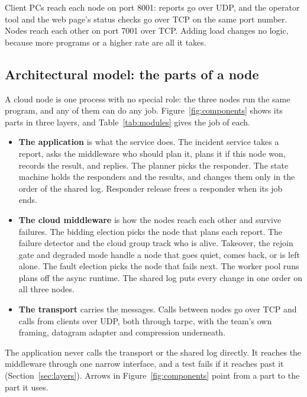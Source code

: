 Client PCs reach each node on port 8001: reports go over UDP, and the operator tool and the web page's status checks go over TCP on the same port number. Nodes reach each other on port 7001 over TCP. Adding load changes no logic, because more programs or a higher rate are all it takes.

\subsection{Architectural model: the parts of a node}
\label{sec:components}

A cloud node is one process with no special role: the three nodes run the same program, and any of them can do any job. Figure~\ref{fig:components} shows its parts in three layers, and Table~\ref{tab:modules} gives the job of each.

\begin{itemize}
  \item \textbf{The application} is what the service does. The incident service takes a report, asks the middleware who should plan it, plans it if this node won, records the result, and replies. The planner picks the responder. The state machine holds the responders and the results, and changes them only in the order of the shared log. Responder release frees a responder when its job ends.
  \item \textbf{The cloud middleware} is how the nodes reach each other and survive failures. The bidding election picks the node that plans each report. The failure detector and the cloud group track who is alive. Takeover, the rejoin gate and degraded mode handle a node that goes quiet, comes back, or is left alone. The fault election picks the node that fails next. The worker pool runs plans off the async runtime. The shared log puts every change in one order on all three nodes.
  \item \textbf{The transport} carries the messages. Calls between nodes go over TCP and calls from clients over UDP, both through tarpc, with the team's own framing, datagram adapter and compression underneath.
\end{itemize}

The application never calls the transport or the shared log directly. It reaches the middleware through one narrow interface, and a test fails if it reaches past it (Section~\ref{sec:layers}). Arrows in Figure~\ref{fig:components} point from a part to the part it uses.

